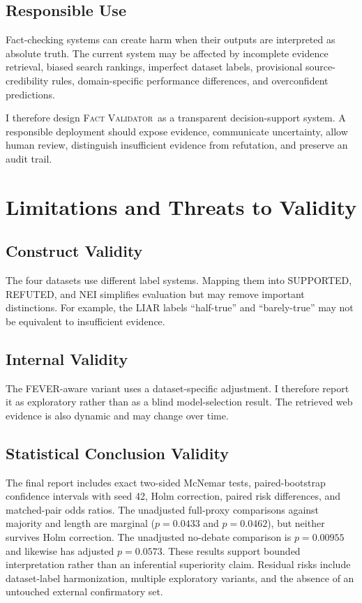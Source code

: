 \documentclass[12pt,a4paper,openany]{report}
\newcommand{\system}{\textsc{Fact Validator}}
\begin{document}
\section{Responsible Use}
Fact-checking systems can create harm when their outputs are interpreted as absolute truth. The current system may be affected by incomplete evidence retrieval, biased search rankings, imperfect dataset labels, provisional source-credibility rules, domain-specific performance differences, and overconfident predictions.

I therefore design \system\ as a transparent decision-support system. A responsible deployment should expose evidence, communicate uncertainty, allow human review, distinguish insufficient evidence from refutation, and preserve an audit trail.

\chapter{Limitations and Threats to Validity}
\section{Construct Validity}
The four datasets use different label systems. Mapping them into SUPPORTED, REFUTED, and NEI simplifies evaluation but may remove important distinctions. For example, the LIAR labels ``half-true'' and ``barely-true'' may not be equivalent to insufficient evidence.

\section{Internal Validity}
The FEVER-aware variant uses a dataset-specific adjustment. I therefore report it as exploratory rather than as a blind model-selection result. The retrieved web evidence is also dynamic and may change over time.

\section{Statistical Conclusion Validity}
The final report includes exact two-sided McNemar tests, paired-bootstrap confidence intervals with seed 42, Holm correction, paired risk differences, and matched-pair odds ratios. The unadjusted full-proxy comparisons against majority and length are marginal ($p=0.0433$ and $p=0.0462$), but neither survives Holm correction. The unadjusted no-debate comparison is $p=0.00955$ and likewise has adjusted $p=0.0573$. These results support bounded interpretation rather than an inferential superiority claim. Residual risks include dataset-label harmonization, multiple exploratory variants, and the absence of an untouched external confirmatory set.
\end{document}
